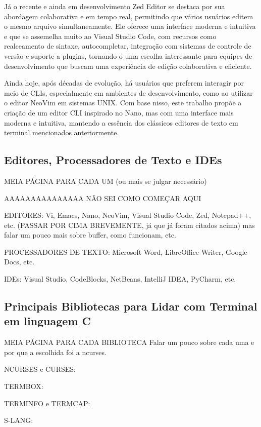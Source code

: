 Já o recente e ainda em desenvolvimento Zed Editor se destaca por sua abordagem colaborativa e em tempo real, permitindo que vários usuários editem o mesmo
arquivo simultaneamente. Ele oferece uma interface moderna e intuitiva e que se assemelha muito ao Visual Studio Code, com recursos como realceamento de sintaxe,
autocompletar, integração com sistemas de controle de versão e suporte a plugins, tornando-o uma escolha interessante para equipes de desenvolvimento que buscam
uma experiência de edição colaborativa e eficiente.

Ainda hoje, após décadas de evolução, há usuários que preferem interagir por meio de CLIs, especialmente em ambientes de desenvolvimento, como ao utilizar o
editor NeoVim em sistemas UNIX. Com base nisso, este trabalho propõe a criação de um editor CLI inspirado no Nano, mas com uma interface mais moderna e
intuitiva, mantendo a essência dos clássicos editores de texto em terminal mencionados anteriormente.

\subsection{Editores, Processadores de Texto e IDEs}

MEIA PÁGINA PARA CADA UM (ou mais se julgar necessário)

AAAAAAAAAAAAAAA NÃO SEI COMO COMEÇAR AQUI

EDITORES: Vi, Emacs, Nano, NeoVim, Visual Studio Code, Zed, Notepad++, etc. (PASSAR POR CIMA BREVEMENTE, já que já foram citados acima) mas falar um pouco mais
sobre buffer, como funcionam, etc.

PROCESSADORES DE TEXTO: Microsoft Word, LibreOffice Writer, Google Docs, etc.

IDEs: Visual Studio, CodeBlocks, NetBeans, IntelliJ IDEA, PyCharm, etc.

\subsection{Principais Bibliotecas para Lidar com Terminal em linguagem C}

MEIA PÁGINA PARA CADA BIBLIOTECA
Falar um pouco sobre cada uma e por que a escolhida foi a ncurses.

NCURSES e CURSES:

TERMBOX:

TERMINFO e TERMCAP:

S-LANG:
